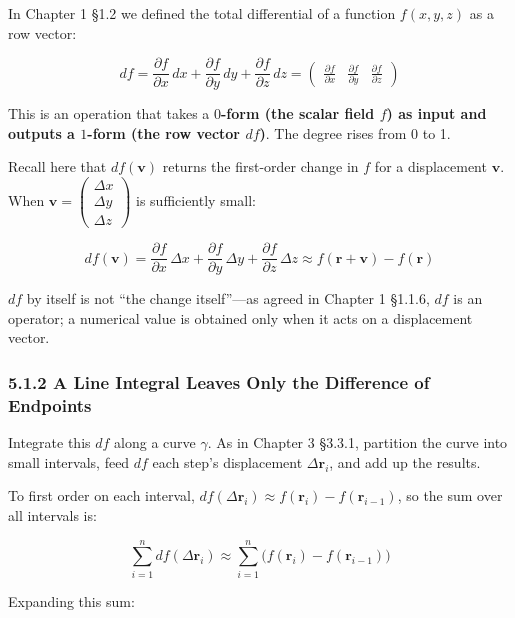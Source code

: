 In Chapter 1 §1.2 we defined the total differential of a function
\(f(x,y,z)\) as a row vector:

\[df = \frac{\partial f}{\partial x}\,dx + \frac{\partial f}{\partial y}\,dy + \frac{\partial f}{\partial z}\,dz = \begin{pmatrix} \frac{\partial f}{\partial x} & \frac{\partial f}{\partial y} & \frac{\partial f}{\partial z} \end{pmatrix}\]

This is an operation that takes a
\textbf{$0$-form (the scalar field $f$) as input and outputs a $1$-form (the row vector $df$)}.
The degree rises from 0 to 1.

Recall here that \(df(\mathbf{v})\) returns the first-order change in
\(f\) for a displacement \(\mathbf{v}\). When
\(\mathbf{v} = \begin{pmatrix}\Delta x\\\Delta y\\\Delta z\end{pmatrix}\)
is sufficiently small:

\[df(\mathbf{v}) = \frac{\partial f}{\partial x}\,\Delta x + \frac{\partial f}{\partial y}\,\Delta y + \frac{\partial f}{\partial z}\,\Delta z \approx f(\mathbf{r}+\mathbf{v}) - f(\mathbf{r})\]

\(df\) by itself is not ``the change itself''---as agreed in Chapter 1
§1.1.6, \(df\) is an operator; a numerical value is obtained only when
it acts on a displacement vector.

\hypertarget{a-line-integral-leaves-only-the-difference-of-endpoints}{%
\subsubsection{5.1.2 A Line Integral Leaves Only the Difference of
Endpoints}\label{a-line-integral-leaves-only-the-difference-of-endpoints}}

Integrate this \(df\) along a curve \(\gamma\). As in Chapter 3 §3.3.1,
partition the curve into small intervals, feed \(df\) each step's
displacement \(\Delta\mathbf{r}_i\), and add up the results.

To first order on each interval,
\(df(\Delta\mathbf{r}_i) \approx f(\mathbf{r}_i) - f(\mathbf{r}_{i-1})\),
so the sum over all intervals is:

\[\sum_{i=1}^n df(\Delta\mathbf{r}_i) \approx \sum_{i=1}^n \bigl(f(\mathbf{r}_i) - f(\mathbf{r}_{i-1})\bigr)\]

Expanding this sum:


